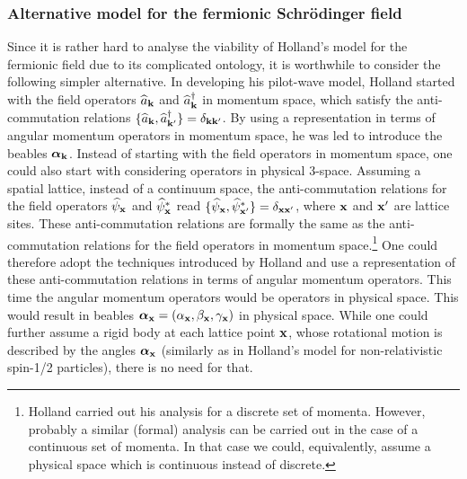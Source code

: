 \documentclass[12pt]{article}
\begin{document}
\subsubsection{Alternative model for the fermionic Schr\"odinger field}\label{alternativemodel}
Since it is rather hard to analyse the viability of Holland's model for the fermionic field due to its complicated ontology, it is worthwhile to consider the following simpler alternative. In developing his pilot-wave model, Holland started with the field operators ${\widehat a}_{\bf k}$ and ${\widehat a}^\dagger_{\bf k}$ in momentum space, which satisfy the anti-commutation relations $\{{\widehat a}_{\bf k},{\widehat a}^\dagger_{{\bf k}'}\} = \delta_{{\bf k}{\bf k}'}$. By using a representation in terms of angular momentum operators in momentum space, he was led to introduce the beables ${\boldsymbol \alpha}_{\bf k}$. Instead of starting with the field operators in momentum space, one could also start with considering operators in physical 3-space. Assuming a spatial lattice, instead of a continuum space, the anti-commutation relations for the field operators ${\widehat \psi}_{\bf x}$ and ${\widehat \psi}^*_{\bf x}$ read $\{{\widehat \psi}_{\bf x},{\widehat \psi^*}_{{\bf x}'}\} = \delta_{{\bf x}{\bf x}'}$, where ${\bf x}$ and ${\bf x}'$ are lattice sites. These anti-commutation relations are formally the same as the anti-commutation relations for the field operators in momentum space.{\footnote{Holland carried out his analysis for a discrete set of momenta. However, probably a similar (formal) analysis can be carried out in the case of a continuous set of momenta. In that case we could, equivalently, assume a physical space which is continuous instead of discrete.}} One could therefore adopt the techniques introduced by Holland and use a representation of these anti-commutation relations in terms of angular momentum operators. This time the angular momentum operators would be operators in physical space. This would result in beables ${\boldsymbol \alpha}_{\bf x}=(\alpha_{\bf x},\beta_{\bf x},\gamma_{\bf x})$ in physical space. While one could further assume a rigid body at each lattice point ${\bf x}$, whose rotational motion is described by the angles ${\boldsymbol \alpha}_{\bf x}$ (similarly as in Holland's model for non-relativistic spin-1/2 particles), there is no need for that. 
\end{document}

